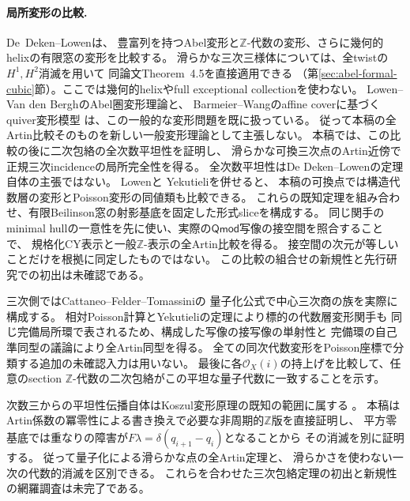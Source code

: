 \documentclass[11pt,a4paper]{ltjsarticle}
\numberwithin{equation}{section}
\begin{document}
\paragraph{局所変形の比較.}
De~Deken--Lowen\cite[Theorems~4.5,5.15]{DeDekenLowen}は、
豊富列を持つAbel変形と$\mathbb Z$-代数の変形、さらに幾何的helixの有限窓の変形を比較する。
滑らかな三次三様体については、全twistの$H^1,H^2$消滅を用いて
同論文Theorem~4.5を直接適用できる
（第\ref{sec:abel-formal-cubic}節）。ここでは幾何的helixやfull exceptional collectionを使わない。
Lowen--Van den BerghのAbel圏変形理論\cite{LowenVdBDeformation,LowenVdBHochschild}と、
Barmeier--Wangのaffine coverに基づくquiver変形模型
\cite[Theorems~1.2,3.11]{BarmeierWangSheaves}は、この一般的な変形問題を既に扱っている。
従って本稿の全Artin比較そのものを新しい一般変形理論として主張しない。
本稿では、この比較の後に二次包絡の全次数平坦性を証明し、
滑らかな可換三次点のArtin近傍で正規三次incidenceの局所完全性を得る。
全次数平坦性はDe Deken--Lowenの定理自体の主張ではない。
Lowen\cite[Theorems~3.14,3.26]{LowenRinged}と
Yekutieli\cite[Corollary~11.2]{YekutieliTwisted}を併せると、
本稿の可換点では構造代数層の変形とPoisson変形の同値類も比較できる。
これらの既知定理を組み合わせ、有限Beilinson窓の射影基底を固定した形式sliceを構成する。
同じ関手のminimal hullの一意性を先に使い、実際の$\mathsf{Qmod}$写像の接空間を照合することで、
規格化CY表示と一般$\mathbb Z$-表示の全Artin比較を得る。
接空間の次元が等しいことだけを根拠に同定したものではない。
この比較の組合せの新規性と先行研究での初出は未確認である。

三次側ではCattaneo--Felder--Tomassini\cite[\S3 and Corollary~5.2(iv)]{CFT}の
量子化公式で中心三次商の族を実際に構成する。
相対Poisson計算とYekutieliの定理により標的の代数層変形関手も
同じ完備局所環で表されるため、構成した写像の接写像の単射性と
完備環の自己準同型の議論により全Artin同型を得る。
全ての同次代数変形をPoisson座標で分類する追加の未確認入力は用いない。
最後に各$\mathcal O_X(i)$の持上げを比較して、任意のsection
$\mathbb Z$-代数の二次包絡がこの平坦な量子代数に一致することを示す。

次数三からの平坦性伝播自体はKoszul変形原理の既知の範囲に属する
\cite[Chapter~6, Theorem~7.3]{PPQuadratic}。
本稿はArtin係数の冪零性による書き換えで必要な非周期的$\mathbb Z$版を直接証明し、
平方零基底では重なりの障害が$F\lambda=\delta(q_{i+1}-q_i)$となることから
その消滅を別に証明する。
従って量子化による滑らかな点の全Artin定理と、
滑らかさを使わない一次の代数的消滅を区別できる。
これらを合わせた三次包絡定理の初出と新規性の網羅調査は未完了である。
\end{document}
